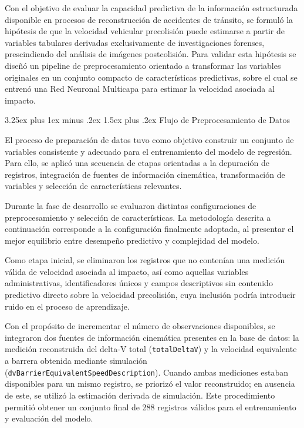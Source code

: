 \documentclass[esp]{SpeedEstimationAI_paper}
\makeatletter
\renewcommand{\paragraph}{%
  \@startsection{paragraph}{4}{0mm}%
  {3.25ex plus 1ex minus .2ex}%
  {1.5ex plus .2ex}%
  {\normalfont\normalsize\bfseries}%
}
\makeatother
\begin{document}
Con el objetivo de evaluar la capacidad predictiva de la información estructurada disponible en procesos de reconstrucción de accidentes de tránsito, se formuló la hipótesis de que la velocidad vehicular precolisión puede estimarse a partir de variables tabulares derivadas exclusivamente de investigaciones forenses, prescindiendo del análisis de imágenes postcolisión. Para validar esta hipótesis se diseñó un pipeline de preprocesamiento orientado a transformar las variables originales en un conjunto compacto de características predictivas, sobre el cual se entrenó una Red Neuronal Multicapa para estimar la velocidad asociada al impacto.

\paragraph{Flujo de Preprocesamiento de Datos}

El proceso de preparación de datos tuvo como objetivo construir un conjunto de variables consistente y adecuado para el entrenamiento del modelo de regresión. Para ello, se aplicó una secuencia de etapas orientadas a la depuración de registros, integración de fuentes de información cinemática, transformación de variables y selección de características relevantes.

Durante la fase de desarrollo se evaluaron distintas configuraciones de preprocesamiento y selección de características. La metodología descrita a continuación corresponde a la configuración finalmente adoptada, al presentar el mejor equilibrio entre desempeño predictivo y complejidad del modelo.

Como etapa inicial, se eliminaron los registros que no contenían una medición válida de velocidad asociada al impacto, así como aquellas variables administrativas, identificadores únicos y campos descriptivos sin contenido predictivo directo sobre la velocidad precolisión, cuya inclusión podría introducir ruido en el proceso de aprendizaje.

Con el propósito de incrementar el número de observaciones disponibles, se integraron dos fuentes de información cinemática presentes en la base de datos: la medición reconstruida del delta-V total (\texttt{totalDeltaV}) y la velocidad equivalente a barrera obtenida mediante simulación (\texttt{dvBarrierEquivalentSpeedDescription}). Cuando ambas mediciones estaban disponibles para un mismo registro, se priorizó el valor reconstruido; en ausencia de este, se utilizó la estimación derivada de simulación. Este procedimiento permitió obtener un conjunto final de 288 registros válidos para el entrenamiento y evaluación del modelo.
\end{document}
